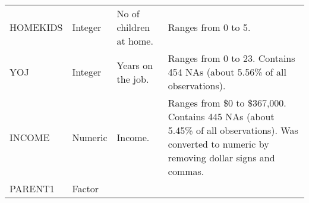 \documentclass[]{article}
\begin{document}
\begin{longtable}[]{@{}llll@{}}
\begin{minipage}[t]{0.16\columnwidth}
HOMEKIDS\strut
\end{minipage} & \begin{minipage}[t]{0.12\columnwidth}\raggedright\strut
Integer\strut
\end{minipage} & \begin{minipage}[t]{0.28\columnwidth}\raggedright\strut
No of children at home.\strut
\end{minipage} & \begin{minipage}[t]{0.28\columnwidth}\raggedright\strut
Ranges from 0 to 5.\strut
\end{minipage}\tabularnewline
\begin{minipage}[t]{0.16\columnwidth}\raggedright\strut
YOJ\strut
\end{minipage} & \begin{minipage}[t]{0.12\columnwidth}\raggedright\strut
Integer\strut
\end{minipage} & \begin{minipage}[t]{0.28\columnwidth}\raggedright\strut
Years on the job.\strut
\end{minipage} & \begin{minipage}[t]{0.28\columnwidth}\raggedright\strut
Ranges from 0 to 23. Contains 454 NAs (about 5.56\% of all
observations).\strut
\end{minipage}\tabularnewline
\begin{minipage}[t]{0.16\columnwidth}\raggedright\strut
INCOME\strut
\end{minipage} & \begin{minipage}[t]{0.12\columnwidth}\raggedright\strut
Numeric\strut
\end{minipage} & \begin{minipage}[t]{0.28\columnwidth}\raggedright\strut
Income.\strut
\end{minipage} & \begin{minipage}[t]{0.28\columnwidth}\raggedright\strut
Ranges from \$0 to \$367,000. Contains 445 NAs (about 5.45\% of all
observations). Was converted to numeric by removing dollar signs and
commas.\strut
\end{minipage}\tabularnewline
\begin{minipage}[t]{0.16\columnwidth}\raggedright\strut
PARENT1\strut
\end{minipage} & \begin{minipage}[t]{0.12\columnwidth}\raggedright\strut
Factor\strut
\end{minipage} & \begin{minipage}[t]{0.28\columnwidth}\raggedright\strut

\end{minipage}
\end{longtable}
\end{document}
